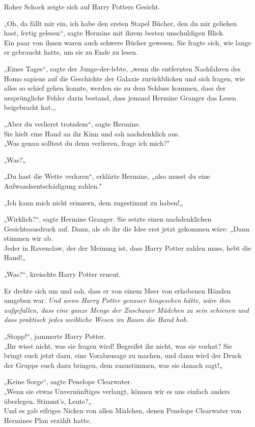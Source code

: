 {Roher Schock zeigte sich auf Harry Potters Gesicht.

„Oh, da fällt mir ein, ich habe den ersten Stapel Bücher, den du mir geliehen hast, fertig gelesen“, sagte Hermine mit ihrem besten unschuldigen Blick.\\ Ein paar von ihnen waren auch schwere Bücher gewesen. Sie fragte sich, wie lange er gebraucht hatte, um sie zu Ende zu lesen.

„Eines Tages“, sagte der Junge-der-lebte, „wenn die entfernten Nachfahren des Homo sapiens auf die Geschichte der Galaxie zurückblicken und sich fragen, wie alles so schief gehen konnte, werden sie zu dem Schluss kommen, dass der ursprüngliche Fehler darin bestand, dass jemand Hermine Granger das Lesen beigebracht hat.„

„Aber du verlierst trotzdem“, sagte Hermine.\\ Sie hielt eine Hand an ihr Kinn und sah nachdenklich aus.\\ „Was genau solltest du denn verlieren, frage ich mich?"

„Was?„

„Du hast die Wette verloren“, erklärte Hermine, „also musst du eine Aufwandsentschädigung zahlen."

„Ich kann mich nicht erinnern, dem zugestimmt zu haben!„

„Wirklich?“, sagte Hermine Granger. Sie setzte einen nachdenklichen Gesichtsausdruck auf. Dann, als ob ihr die Idee erst jetzt gekommen wäre: „Dann stimmen wir ab.\\ Jeder in Ravenclaw, der der Meinung ist, dass Harry Potter zahlen muss, hebt die Hand!„

„Was?“, kreischte Harry Potter erneut.

Er drehte sich um und sah, dass er von einem Meer von erhobenen Händen umgeben war. \emph{Und wenn Harry Potter genauer hingesehen hätte, wäre ihm aufgefallen, dass eine ganze Menge der Zuschauer Mädchen zu sein schienen und dass praktisch jedes weibliche Wesen im Raum die Hand hob.}

„Stopp!“, jammerte Harry Potter.\\ „Ihr wisst nicht, was sie fragen wird! Begreifst ihr nicht, was sie vorhat? Sie bringt euch jetzt dazu, eine Vorabzusage zu machen, und dann wird der Druck der Gruppe euch dazu bringen, dem zuzustimmen, was sie danach sagt!„

„Keine Sorge“, sagte Penelope Clearwater.\\ „Wenn sie etwas Unvernünftiges verlangt, können wir es uns einfach anders überlegen. Stimmt's, Leute?„\\ Und es gab eifriges Nicken von allen Mädchen, denen Penelope Clearwater von Hermines Plan erzählt hatte.

}
